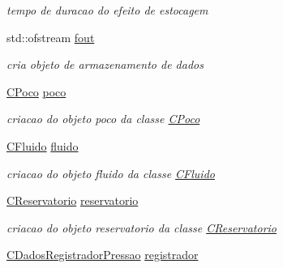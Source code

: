 \begin{DoxyCompactItemize}
\begin{DoxyCompactList}\small\item\em tempo de duracao do efeito de estocagem \end{DoxyCompactList}\item 
\hypertarget{classCSimuladorAnaliseTestePressao_aa143509a0af5103d4be29863e71c33c6}{std\-::ofstream \hyperlink{classCSimuladorAnaliseTestePressao_aa143509a0af5103d4be29863e71c33c6}{fout}}\label{classCSimuladorAnaliseTestePressao_aa143509a0af5103d4be29863e71c33c6}

\begin{DoxyCompactList}\small\item\em cria objeto de armazenamento de dados \end{DoxyCompactList}\item 
\hypertarget{classCSimuladorAnaliseTestePressao_acd63655a60e5822852b0f94b44a85169}{\hyperlink{classCPoco}{C\-Poco} \hyperlink{classCSimuladorAnaliseTestePressao_acd63655a60e5822852b0f94b44a85169}{poco}}\label{classCSimuladorAnaliseTestePressao_acd63655a60e5822852b0f94b44a85169}

\begin{DoxyCompactList}\small\item\em criacao do objeto poco da classe \hyperlink{classCPoco}{C\-Poco} \end{DoxyCompactList}\item 
\hypertarget{classCSimuladorAnaliseTestePressao_a94e2a61bbe5f76dca90a44e477635af8}{\hyperlink{classCFluido}{C\-Fluido} \hyperlink{classCSimuladorAnaliseTestePressao_a94e2a61bbe5f76dca90a44e477635af8}{fluido}}\label{classCSimuladorAnaliseTestePressao_a94e2a61bbe5f76dca90a44e477635af8}

\begin{DoxyCompactList}\small\item\em criacao do objeto fluido da classe \hyperlink{classCFluido}{C\-Fluido} \end{DoxyCompactList}\item 
\hypertarget{classCSimuladorAnaliseTestePressao_a4d52ce30c56b27d961fd4b4e93c86ebb}{\hyperlink{classCReservatorio}{C\-Reservatorio} \hyperlink{classCSimuladorAnaliseTestePressao_a4d52ce30c56b27d961fd4b4e93c86ebb}{reservatorio}}\label{classCSimuladorAnaliseTestePressao_a4d52ce30c56b27d961fd4b4e93c86ebb}

\begin{DoxyCompactList}\small\item\em criacao do objeto reservatorio da classe \hyperlink{classCReservatorio}{C\-Reservatorio} \end{DoxyCompactList}\item 
\hypertarget{classCSimuladorAnaliseTestePressao_aa7bbb2d46909207f38fb3b1b4ce9730a}{\hyperlink{classCDadosRegistradorPressao}{C\-Dados\-Registrador\-Pressao} \hyperlink{classCSimuladorAnaliseTestePressao_aa7bbb2d46909207f38fb3b1b4ce9730a}{registrador}}\label{classCSimuladorAnaliseTestePressao_aa7bbb2d46909207f38fb3b1b4ce9730a}


\end{DoxyCompactItemize}

